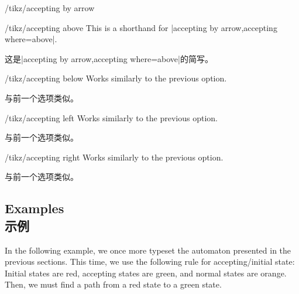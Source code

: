 \begin{stylekey}{/tikz/accepting by arrow}
\begin{codeexample}[preamble={\usetikzlibrary{arrows.meta,automata,positioning}}]
\end{codeexample}
\end{stylekey}

\begin{stylekey}{/tikz/accepting above}
    This is a shorthand for |accepting by arrow,accepting where=above|.

    这是|accepting by arrow,accepting where=above|的简写。
\end{stylekey}

\begin{stylekey}{/tikz/accepting below}
    Works similarly to the previous option.

    与前一个选项类似。
\end{stylekey}

\begin{stylekey}{/tikz/accepting left}
    Works similarly to the previous option.

    与前一个选项类似。
\end{stylekey}

\begin{stylekey}{/tikz/accepting right}
    Works similarly to the previous option.

    与前一个选项类似。
\end{stylekey}


\subsection{Examples\\示例}

In the following example, we once more typeset the automaton presented in the
previous sections. This time, we use the following rule for accepting/initial
state: Initial states are red, accepting states are green, and normal states
are orange. Then, we must find a path from a red state to a green state.

